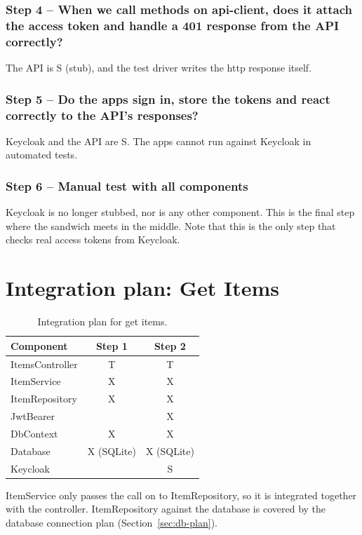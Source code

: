 \documentclass[a4paper,11pt]{article}
\begin{document}
\subsubsection*{Step 4 -- When we call methods on api-client, does it attach the access token and handle a 401 response from the API correctly?}
The API is S (stub), and the test driver writes the http response itself.

\subsubsection*{Step 5 -- Do the apps sign in, store the tokens and react correctly to the API's responses?}
Keycloak and the API are S. The apps cannot run against Keycloak in automated tests.

\subsubsection*{Step 6 -- Manual test with all components}
Keycloak is no longer stubbed, nor is any other component. This is the final step where the sandwich meets in the middle. Note that this is the only step that checks real access tokens from Keycloak.

\section{Integration plan: Get Items}
\label{sec:items-plan}

\begin{table}[H]
\centering
\small
{}
\begin{tabular}{@{}l c c@{}}
\textbf{Component} & \textbf{Step 1} & \textbf{Step 2} \\
\hline
ItemsController & T & T \\
ItemService     & X & X \\
ItemRepository  & X & X \\
JwtBearer       &   & X \\
DbContext       & X & X \\
Database        & X (SQLite) & X (SQLite) \\
Keycloak        &   & S \\
\end{tabular}
\caption{Integration plan for get items.}
\label{tab:items-integration-plan}
\end{table}

ItemService only passes the call on to ItemRepository, so it is integrated together with the controller. ItemRepository against the database is covered by the database connection plan (Section~\ref{sec:db-plan}).
\end{document}
